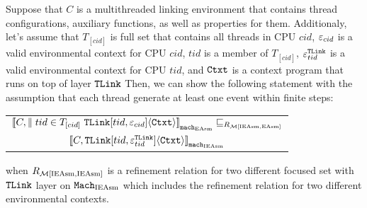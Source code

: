\begin{lemma}
\label{lemma:chapter:conlink:easm-refines-single-ieasm}
Suppose that $C$ is a multithreaded linking environment that contains thread configurations, auxiliary functions, as well as properties for them.
Additionaly, let's assume that  $T_{[cid]}$ is full set that contains all threads in CPU $cid$, 
 ${\varepsilon}_{cid}$ is a valid
environmental context for CPU $cid$,
$tid$ is a member of $T_{[cid]}$,
 ${\varepsilon}^{{{\mathrm{\texttt{TLink}}}}}_{tid}$ is a valid
environmental context for CPU $tid$,
and ${\mathrm{\texttt{Ctxt}}}$ is a
context program that runs on top of layer ${{\mathrm{\texttt{TLink}}}}$
 Then, we can show the following statement
 with the assumption that each thread generate at least one event within finite steps:
 \begin{center}
\begin{tabular}{c}
${[\![{C, \parallel tid \in T_{[cid]} \  {{\mathrm{\texttt{TLink}}}}[tid, {\varepsilon}_{cid}]} \langle {{\mathrm{\texttt{Ctxt}}}} \rangle]\!]}_{{{\mathrm{\texttt{mach}}}_{\mathrm{EAsm}}}} \sqsubseteq_{R_{\mathcal{M}{[\mathrm{IEAsm}, \mathrm{EAsm}]}}}$\\ 
${[\![{C, {{\mathrm{\texttt{TLink}}}}[tid, {\varepsilon}^{{{\mathrm{\texttt{TLink}}}}}_{tid}]} \langle {{\mathrm{\texttt{Ctxt}}}} \rangle]\!]}_{{{\mathrm{\texttt{mach}}}_{\mathrm{IEAsm}}}}$\\
\end{tabular}
\end{center}
when $R_{\mathcal{M}{[\mathrm{IEAsm}, \mathrm{IEAsm}]}}$ is a refinement relation for two different focused set with ${{\mathrm{\texttt{TLink}}}}$ layer on
${\mathrm{\texttt{Mach}}}_{\mathrm{IEAsm}}$ which includes the refinement relation for two different environmental contexts.
\end{lemma}





%
%
%

